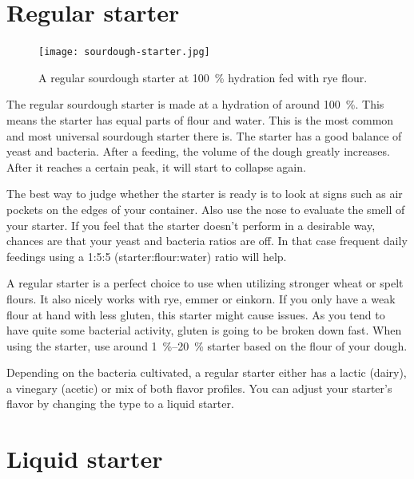 \section{Regular starter}%
\label{sec:regular-starter}

\begin{figure}[!htb]
  \texttt{[image: sourdough-starter.jpg]}
  \caption[Regular starter]{A regular sourdough starter at \qty{100}{\percent}
      hydration fed with rye flour.}%
  \label{fig:regular-sourdough-starter}
\end{figure}

The regular sourdough starter is made at a hydration of around \qty{100}{\percent}.
This means the starter has equal parts of flour and water. This is the most
common and most universal sourdough starter there is. The starter has a good
balance of yeast and bacteria. After a feeding, the volume of the dough
greatly increases. After it reaches a certain peak, it will start to collapse again.

The best way to judge whether the starter is ready is to look at signs such as
air pockets on the edges of your container. Also use the nose to evaluate the
smell of your starter. If you feel that the starter doesn't perform in a
desirable way, chances are that your yeast and bacteria ratios are off. In that
case frequent daily feedings using a 1:5:5 (starter:flour:water) ratio will
help.

A regular starter is a perfect choice to use when utilizing stronger wheat or spelt flours.
It also nicely works with rye, emmer or einkorn. If you only have a weak flour
at hand with less gluten, this starter might cause issues. As you tend to have
quite some bacterial activity, gluten is going to be broken down fast. When
using the starter, use around \qtyrange{1}{20}{\percent} starter based on the flour of your
dough.

Depending on the bacteria cultivated, a regular starter either has a lactic (dairy),
a vinegary (acetic) or mix of both flavor profiles. You can adjust your
starter's flavor by changing the type to a liquid starter.

\section{Liquid starter}%
\label{section:liquid-starter}


